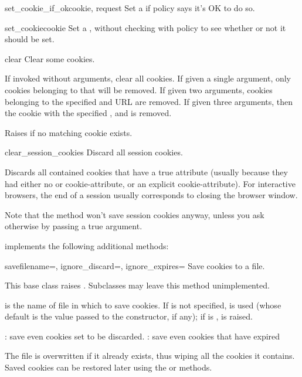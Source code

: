 \begin{methoddesc}[CookieJar]{set_cookie_if_ok}{cookie, request}
Set a  if policy says it's OK to do so.
\end{methoddesc}

\begin{methoddesc}[CookieJar]{set_cookie}{cookie}
Set a , without checking with policy to see whether or
not it should be set.
\end{methoddesc}

\begin{methoddesc}[CookieJar]{clear}{}
Clear some cookies.

If invoked without arguments, clear all cookies.  If given a single
argument, only cookies belonging to that  will be removed.
If given two arguments, cookies belonging to the specified
 and URL  are removed.  If given three
arguments, then the cookie with the specified , 
and  is removed.

Raises  if no matching cookie exists.
\end{methoddesc}

\begin{methoddesc}[CookieJar]{clear_session_cookies}{}
Discard all session cookies.

Discards all contained cookies that have a true 
attribute (usually because they had either no  or
 cookie-attribute, or an explicit 
cookie-attribute).  For interactive browsers, the end of a session
usually corresponds to closing the browser window.

Note that the  method won't save session cookies
anyway, unless you ask otherwise by passing a true
 argument.
\end{methoddesc}

 implements the following additional methods:

\begin{methoddesc}[FileCookieJar]{save}{filename=,
    ignore_discard=, ignore_expires=}
Save cookies to a file.

This base class raises .  Subclasses may
leave this method unimplemented.

 is the name of file in which to save cookies.  If
 is not specified,  is used (whose
default is the value passed to the constructor, if any); if
 is ,  is
raised.

: save even cookies set to be discarded.
: save even cookies that have expired

The file is overwritten if it already exists, thus wiping all the
cookies it contains.  Saved cookies can be restored later using the
 or  methods.
\end{methoddesc}


